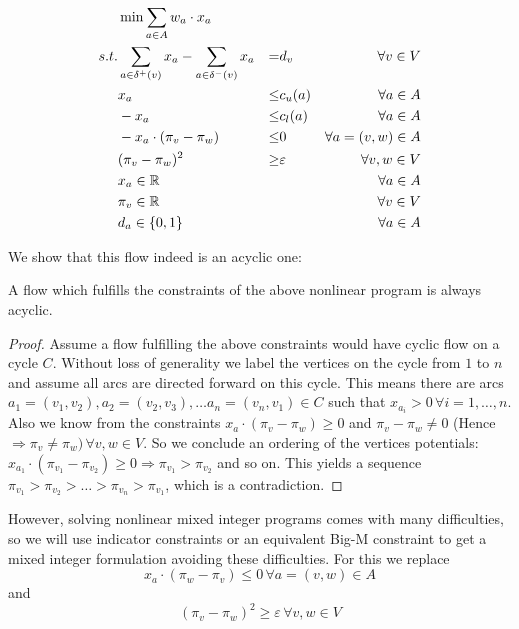 \begin{align*}
  &\min \sum_{a\in A} w_a\cdot x_a & \\
 s.t. & \sum_{a\in \delta^+(v)}x_a - \sum_{a\in\delta^- (v)}x_a &=& d_v\ &\forall v\in V \\
 & x_a &\le& c_u(a) & \forall a\in A\\
 & -x_a &\le& c_l(a) & \forall a\in A\\
 & -x_a\cdot (\pi_v -\pi_w)&\le& 0 &\forall a=(v,w)\in A\\
 & (\pi_v - \pi_w)^2 &\ge& \varepsilon &\forall v,w \in V\\
 & x_a \in \mathbb{R} & & &\forall a\in A\\
 & \pi_v \in \mathbb{R} & & & \forall v\in V\\
 & d_a \in \{0,1\} & & &\forall a\in A\\
\end{align*}

We show that this flow indeed is an acyclic one:

\begin{prop}
 A flow which fulfills the constraints of the above nonlinear program is always acyclic.
\end{prop}
\begin{proof}
 Assume a flow fulfilling the above constraints would have cyclic flow on a cycle $C$. Without loss of generality 
we label the vertices on the cycle from $1$ to $n$ and assume all arcs are directed forward on this cycle. This means 
there are arcs $a_1=(v_1,v_2),a_2=(v_2,v_3), \dots a_n=(v_n, v_1)\in C$ such that $x_{a_i} > 0 \,\forall i={1,\dots , 
n}$. Also we know from the constraints  $x_a\cdot (\pi_v -\pi_w)\ge 0$ and $\pi_v - \pi_w \neq 0$ (Hence $\Rightarrow 
\pi_v\neq\pi_w)\, \forall v,w\in V$. So we conclude an ordering of the vertices potentials: $x_{a_1}\cdot (\pi_{v_1} 
-\pi_{v_2})\ge 0 \Rightarrow \pi_{v_1}>\pi_{v_2}$ and so on. This yields a sequence $\pi_{v_1}>\pi_{v_2}>\dots 
>\pi_{v_n}>\pi_{v_1}$, which is a contradiction. \Lightning
\end{proof}

However, solving nonlinear mixed integer programs comes with many difficulties, so we will use indicator constraints 
or an equivalent Big-M constraint to get a mixed integer formulation avoiding these difficulties. For this we  replace 
$$x_a\cdot (\pi_w -\pi_v)\le 0 \,\forall a=(v,w)\in A $$ and $$(\pi_v - \pi_w)^2 \ge \varepsilon \,\forall v,w \in V$$

